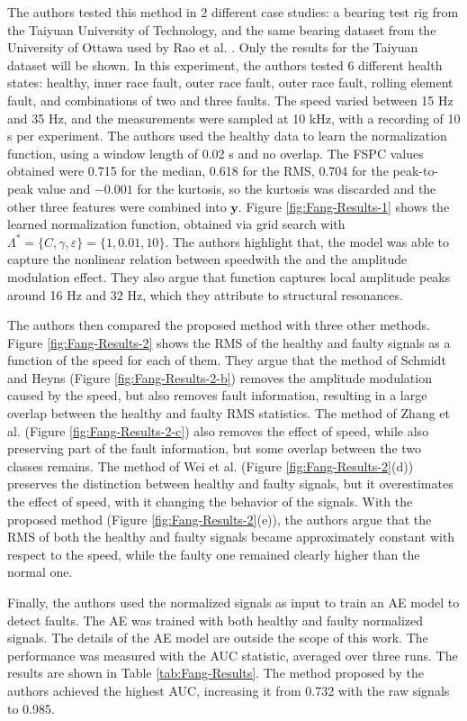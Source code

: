 The authors tested this method in 2 different case studies: a bearing test rig from the Taiyuan University of Technology, and the same bearing dataset from the University of Ottawa used by Rao et al. \cite{RAO2024111751}. Only the results for the Taiyuan dataset will be shown. In this experiment, the authors tested 6 different health states: healthy, inner race fault, outer race fault, outer race fault, rolling element fault, and combinations of two and three faults. The speed varied between 15 Hz and 35 Hz, and the measurements were sampled at 10 kHz, with a recording of 10 s per experiment. The authors used the healthy data to learn the normalization function, using a window length of 0.02 s and no overlap. The FSPC values obtained were 0.715 for the median, 0.618 for the RMS, 0.704 for the peak-to-peak value and $-0.001$ for the kurtosis, so the kurtosis was discarded and the other three features were combined into $\mathbf{y}$. Figure \ref{fig:Fang-Results-1} shows the learned normalization function, obtained via grid search with $\Lambda^* = \{C, \gamma, \varepsilon\} = \{1, 0.01, 10\}$. The authors highlight that, the model was able to capture the nonlinear relation between speedwith the and the amplitude modulation effect. They also argue that function captures local amplitude peaks around 16 Hz and 32 Hz, which they attribute to structural resonances.

The authors then compared the proposed method with three other methods. Figure \ref{fig:Fang-Results-2} shows the RMS of the healthy and faulty signals as a function of the speed for each of them. They argue that the method of Schmidt and Heyns (Figure \ref{fig:Fang-Results-2-b}) removes the amplitude modulation caused by the speed, but also removes fault information, resulting in a large overlap between the healthy and faulty RMS statistics. The method of Zhang et al. (Figure \ref{fig:Fang-Results-2-c}) also removes the effect of speed, while also preserving part of the fault information, but some overlap between the two classes remains. The method of Wei et al. (Figure \ref{fig:Fang-Results-2}(d)) preserves the distinction between healthy and faulty signals, but it overestimates the effect of speed, with it changing the behavior of the signals. With the proposed method (Figure \ref{fig:Fang-Results-2}(e)), the authors argue that the RMS of both the healthy and faulty signals became approximately constant with respect to the speed, while the faulty one remained clearly higher than the normal one. 

Finally, the authors used the normalized signals as input to train an AE model to detect faults. The AE was trained with both healthy and faulty normalized signals. The details of the AE model are outside the scope of this work. The performance was measured with the AUC statistic, averaged over three runs. The results are shown in Table \ref{tab:Fang-Results}. The method proposed by the authors achieved the highest AUC, increasing it from 0.732 with the raw signals to 0.985.

